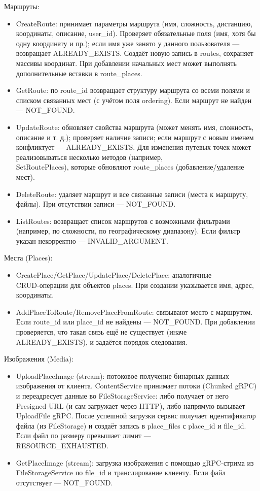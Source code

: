 Маршруты:
\begin{itemize}
    \item CreateRoute: принимает параметры маршрута (имя, сложность, дистанцию, координаты, описание, user\_id). Проверяет обязательные поля (имя, хотя бы одну координату и пр.); если имя уже занято у данного пользователя — возвращает ALREADY\_EXISTS. Создаёт новую запись в routes, сохраняет массивы координат. При добавлении начальных мест может выполнять дополнительные вставки в route\_places.
    \item GetRoute: по route\_id возвращает структуру маршрута со всеми полями и списком связанных мест (с учётом поля ordering). Если маршрут не найден — NOT\_FOUND.
    \item UpdateRoute: обновляет свойства маршрута (может менять имя, сложность, описание и т. д.); проверяет наличие записи; если маршрут с новым именем конфликтует — ALREADY\_EXISTS. Для изменения путевых точек может реализовываться несколько методов (например, \\ SetRoutePlaces), которые обновляют route\_places (добавление/удаление мест).
    \item DeleteRoute: удаляет маршрут и все связанные записи (места к маршруту, файлы). При отсутствии записи — NOT\_FOUND.
    \item ListRoutes: возвращает список маршрутов с возможными фильтрами (например, по сложности, по географическому диапазону). Если фильтр указан некорректно — INVALID\_ARGUMENT.
\end{itemize}
Места (Places):
\begin{itemize}
    \item CreatePlace/GetPlace/UpdatePlace/DeletePlace: аналогичные \\ CRUD-операции для объектов places. При создании указывается имя, адрес, координаты.
    \item AddPlaceToRoute/RemovePlaceFromRoute: связывают место с маршрутом. Если route\_id или place\_id не найдены — NOT\_FOUND. При добавлении проверяется, что такая связь ещё не существует (иначе \\ ALREADY\_EXISTS), и задаётся порядок следования.
\end{itemize}
Изображения (Media):
\begin{itemize}
    \item UploadPlaceImage (stream): потоковое получение бинарных данных изображения от клиента. ContentService принимает потоки (Chunked gRPC) и переадресует данные во FileStorageService: либо получает от него Presigned URL (и сам загружает через HTTP), либо напрямую вызывает UploadFile gRPC. После успешной загрузки сервис получает идентификатор файла (из FileStorage) и создаёт запись в place\_files с place\_id и file\_id. Если файл по размеру превышает лимит — \\ RESOURCE\_EXHAUSTED.
    \item GetPlaceImage (stream): загрузка изображения с помощью gRPC-стрима из FileStorageService по file\_id и транслирование клиенту. Если файл отсутствует — NOT\_FOUND.
\end{itemize}

